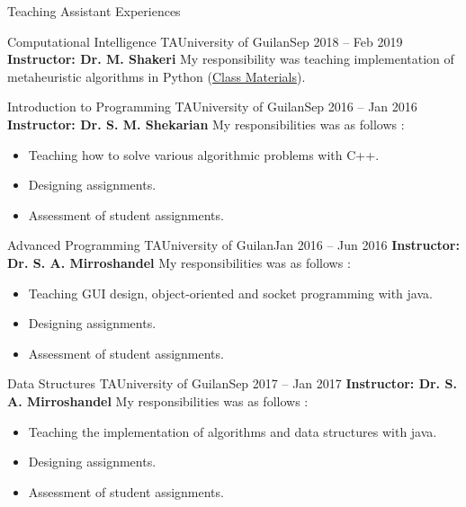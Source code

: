 \documentclass[]{mcdowellcv}
\begin{document}
	
    \begin{cvsection}{Teaching Assistant Experiences}
    	\begin{cvsubsection}{Computational Intelligence TA}{University of Guilan}{Sep 2018 -- Feb 2019}
    	    \setlength{\columnsep}{-2.1in}
    	    \textbf{Instructor: Dr. M. Shakeri} \newline
    		My responsibility was teaching implementation of metaheuristic algorithms in Python (\href{https://github.com/Computational-Intelligence-Fall18/Computational-Intelligence-Tutorials}{Class Materials}).
    	\end{cvsubsection}
    	
    	\begin{cvsubsection}{Introduction to Programming TA}{University of Guilan}{Sep 2016 -- Jan 2016}
    	    \setlength{\columnsep}{-2.1in}
    	    \textbf{Instructor: Dr. S. M. Shekarian} \newline
    	    My responsibilities was as follows :
    	    \begin{itemize}
                \item Teaching how to solve various algorithmic problems with C++.
                \item Designing assignments.
                \item Assessment of student assignments.
    	   \end{itemize}
    	\end{cvsubsection}
    	
    	\begin{cvsubsection}{Advanced Programming TA}{University of Guilan}{Jan 2016 -- Jun 2016}
    	    \setlength{\columnsep}{-2.1in}
    	    \textbf{Instructor: Dr. S. A. Mirroshandel} \newline
    	    My responsibilities was as follows :
    	    \begin{itemize}
                 \item Teaching GUI design, object-oriented and socket programming with java.
                 \item Designing assignments.
                 \item Assessment of student assignments.
    	   \end{itemize}
    	\end{cvsubsection}
    	
    	\begin{cvsubsection}{Data Structures TA}{University of Guilan}{Sep 2017 -- Jan 2017}
    	    \setlength{\columnsep}{-2.1in}
    	    \textbf{Instructor: Dr. S. A. Mirroshandel} \newline
    	    My responsibilities was as follows :
    	    \begin{itemize}
                 \item Teaching the implementation of algorithms and data structures with java.
                 \item Designing assignments.
                 \item Assessment of student assignments.
     	   \end{itemize}
    

\end{cvsubsection}
\end{cvsection}
\end{document}
